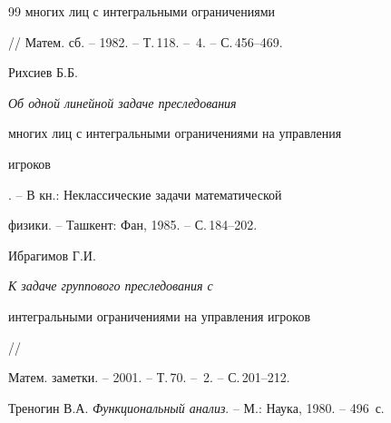 \begin{thebibliography}{99}
{многих лиц с интегральными ограничениями}


// Матем. сб. -- 1982. -- Т.\,118. -- \No\,4. -- С.\,456--469.




Рихсиев Б.Б. {\em Об одной линейной задаче преследования


многих лиц с интегральными ограничениями на управления


игроков}. -- В кн.: Неклассические задачи математической


физики. -- Ташкент: Фан, 1985. -- С.\,184--202.




Ибрагимов Г.И. {\em К задаче группового преследования с


интегральными ограничениями на управления игроков} //


Матем. заметки. -- 2001. -- Т.\,70. -- \No\,2. -- С.\,201--212.




Треногин В.А. {\em Функциональный анализ}. -- М.: Наука, 1980. -- 496~с.





\end{thebibliography}





\vskip 1cm












\label{end}






